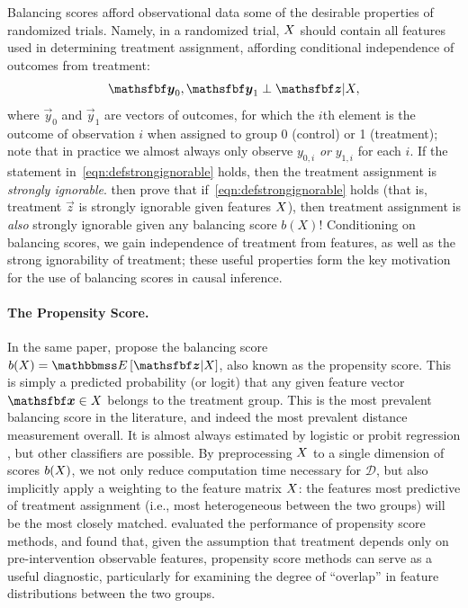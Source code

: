 \documentclass[11pt]{extarticle}
\begin{document}
Balancing scores afford observational data some of the desirable properties of randomized trials. Namely, in a randomized trial, $X$ should contain all features used in determining treatment assignment, affording conditional independence of outcomes from treatment:
\begin{equation}
  \vec{y}_0, \vec{y}_1 \perp \vec{z} | \mat{X}, \label{eqn:defstrongignorable}
\end{equation}
where $\vec{y}_0$ and $\vec{y}_1$ are vectors of outcomes, for which the $i$th element is the outcome of observation $i$ when assigned to group 0 (control) or 1 (treatment); note that in practice we almost always only observe $y_{0,i}$ \emph{or} $y_{1,i}$ for each $i$. If the statement in~\eqref{eqn:defstrongignorable} holds, then the treatment assignment is \emph{strongly ignorable}. \textcite{rosenbaum_central_1983} then prove that if~\eqref{eqn:defstrongignorable} holds (that is, treatment $\vec{z}$ is strongly ignorable given features $X$), then treatment assignment is \emph{also} strongly ignorable given any balancing score $b(X)$! Conditioning on balancing scores, we gain independence of treatment from features, as well as the strong ignorability of treatment; these useful properties form the key motivation for the use of balancing scores in causal inference.


\paragraph{The Propensity Score.} In the same paper, \textcite{rosenbaum_central_1983} propose the balancing score $b(\mat{X}) = \mathbbmss E \left [\vec{z} | \mat{X}\right ]$, also known as the propensity score.
This is simply a predicted probability (or logit) that any given feature vector $\vec{x} \in \mat{X}$ belongs to the treatment group.
This is the most prevalent balancing score in the literature, and indeed the most prevalent distance measurement overall. It is almost always estimated by logistic or probit regression \parencite{garrido_methods_2014}, but other classifiers are possible.
By preprocessing $X$ to a single dimension of scores $b(X)$, we not only reduce computation time necessary for $\mathcal{D}$, but also implicitly apply a weighting to the feature matrix $X$: the features most predictive of treatment assignment (i.e., most heterogeneous between the two groups) will be the most closely matched. \cite{dehejia_causal_1999} evaluated the performance of propensity score methods, and found that, given the assumption that treatment depends only on pre-intervention observable features, propensity score methods can serve as a useful diagnostic, particularly for examining the degree of ``overlap'' in feature distributions between the two groups.
\end{document}
